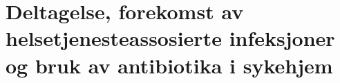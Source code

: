 \documentclass[a4paper,12pt]{article}
\begin{document}
\begin{titlepage}
\begin{figure}
    \centering
    \def\svgwidth{0.3\columnwidth}
    
\end{figure}

  \vspace{2em}{\raggedright
    Fræna --- Høst 2017
  }

  \par
\end{titlepage}

\newpage 

\section{Deltagelse, forekomst av helsetjenesteassosierte infeksjoner og
bruk av antibiotika i
sykehjem}\label{deltagelse-forekomst-av-helsetjenesteassosierte-infeksjoner-og-bruk-av-antibiotika-i-sykehjem}

\blindtext
\end{document}
